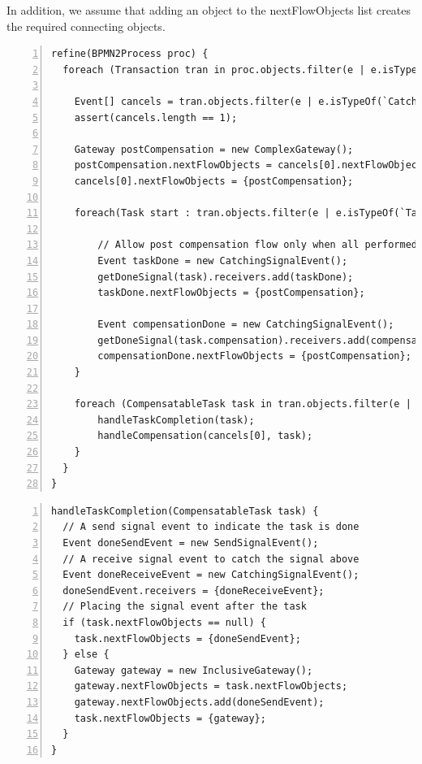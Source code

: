 In addition, we assume that adding an {object} to the {nextFlowObjects} list creates the required connecting objects.

\begin{lstlisting}[float,numbers=left,numbersep=5pt,mathescape=true,caption=Refinement of transactions,label=lst:nrefine]
refine(BPMN2Process proc) {
  foreach (Transaction tran in proc.objects.filter(e | e.isTypeOf(`Transaction'))) {
  
    Event[] cancels = tran.objects.filter(e | e.isTypeOf(`CatchingCancelEvent'));
    assert(cancels.length == 1);
    
    Gateway postCompensation = new ComplexGateway();
    postCompensation.nextFlowObjects = cancels[0].nextFlowObjects;
    cancels[0].nextFlowObjects = {postCompensation};
    
    foreach(Task start : tran.objects.filter(e | e.isTypeOf(`Task') $\wedge$ e.compensation != null) and tran.previousFlowObjects().length == 0) {
    
        // Allow post compensation flow only when all performed compensatable tasks are compensated
        Event taskDone = new CatchingSignalEvent();
        getDoneSignal(task).receivers.add(taskDone);
        taskDone.nextFlowObjects = {postCompensation};
        
        Event compensationDone = new CatchingSignalEvent();
        getDoneSignal(task.compensation).receivers.add(compensationDone);
        compensationDone.nextFlowObjects = {postCompensation};
    }
    
    foreach (CompensatableTask task in tran.objects.filter(e | e.isTypeOf(`Task') $\wedge$ e.compensation != null)) {
        handleTaskCompletion(task);
        handleCompensation(cancels[0], task);
    }
  }
}
\end{lstlisting}
\begin{lstlisting}[float,numbers=left,numbersep=5pt,mathescape=true,caption=Refinement of transactions (dealing with task completion),label=lst:nrefine2]
handleTaskCompletion(CompensatableTask task) {
  // A send signal event to indicate the task is done
  Event doneSendEvent = new SendSignalEvent();
  // A receive signal event to catch the signal above
  Event doneReceiveEvent = new CatchingSignalEvent();  
  doneSendEvent.receivers = {doneReceiveEvent};
  // Placing the signal event after the task
  if (task.nextFlowObjects == null) {
    task.nextFlowObjects = {doneSendEvent};
  } else {
    Gateway gateway = new InclusiveGateway();
    gateway.nextFlowObjects = task.nextFlowObjects;
    gateway.nextFlowObjects.add(doneSendEvent);
    task.nextFlowObjects = {gateway};
  }
}
\end{lstlisting}

